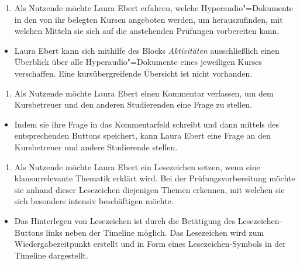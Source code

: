 \vspace{0.25cm}
\begin{enumerate}[resume*]
\item \label{US-Uebersicht-Kurse-Eval} Als Nutzende möchte Laura Ebert erfahren, welche Hyperaudio"=Dokumente in den von ihr belegten Kursen angeboten werden, um herauszufinden, mit welchen Mitteln sie sich auf die anstehenden Prüfungen vorbereiten kann.
\end{enumerate}
\vspace{-0.1cm}
\begin{itemize}
\item[\Asterisk]
Laura Ebert kann sich mithilfe des Blocks \textit{Aktivitäten} ausschließlich einen Überblick über alle Hyperaudio"=Dokumente eines jeweiligen Kurses verschaffen. Eine kursübergreifende Übersicht ist nicht vorhanden.
\end{itemize}
\vspace{0.25cm}
\begin{enumerate}[resume*]
\item \label{US-Kommentar-S-Eval} Als Nutzende möchte Laura Ebert einen Kommentar verfassen, um dem Kursbetreuer und den anderen Studierenden eine Frage zu stellen.
\end{enumerate}
\vspace{-0.1cm}
\begin{itemize}
\item[\Checkmark]
Indem sie ihre Frage in das Kommentarfeld schreibt und dann mittels des entsprechenden Buttons speichert, kann Laura Ebert eine Frage an den Kursbetreuer und andere Studierende stellen.
\end{itemize}
\vspace{0.25cm}
\begin{enumerate}[resume*]
\item \label{US-Lesezeichen-Eval} Als Nutzende möchte Laura Ebert ein Lesezeichen setzen, wenn eine klausurrelevante Thematik erklärt wird. Bei der Prüfungsvorbereitung möchte sie anhand dieser Lesezeichen diejenigen Themen erkennen, mit welchen sie sich besonders intensiv beschäftigen möchte.
\end{enumerate}
\vspace{-0.1cm}
\begin{itemize}
\item[\Checkmark]
Das Hinterlegen von Lesezeichen ist durch die Betätigung des Lesezeichen-Buttons links neben der Timeline möglich. Das Lesezeichen wird zum Wiedergabezeitpunkt erstellt und in Form eines Lesezeichen-Symbols in der Timeline dargestellt.
\end{itemize}
